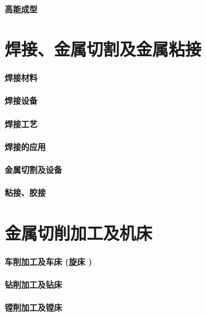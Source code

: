 \documentclass[UTF8]{../../ApplicationUniverse}
\begin{document}
\subsubsection{高能成型}






\chapter{焊接、金属切割及金属粘接}
\subsubsection{焊接材料}
\subsubsection{焊接设备}
\subsubsection{焊接工艺}
\subsubsection{焊接的应用}
\subsubsection{金属切割及设备}
\subsubsection{粘接、胶接}










\chapter{金属切削加工及机床}
\subsubsection{车削加工及车床 (旋床 )}
\subsubsection{钻削加工及钻床}
\subsubsection{镗削加工及镗床}
\end{document}
